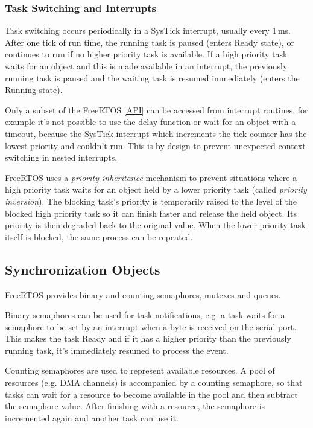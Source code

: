 \subsubsection{Task Switching and Interrupts}

Task switching occurs periodically in a SysTick interrupt, usually every 1\,ms. After one tick of run time, the running task is paused (enters Ready state), or continues to run if no higher priority task is available. If a high priority task waits for an object and this is made available in an interrupt, the previously running task is paused and the waiting task is resumed immediately (enters the Running state). 

Only a subset of the FreeRTOS \ref{API} can be accessed from interrupt routines, for example it's not possible to use the delay function or wait for an object with a timeout, because the SysTick interrupt which increments the tick counter has the lowest priority and couldn't run. This is by design to prevent unexpected context switching in nested interrupts.

FreeRTOS uses a \textit{priority inheritance} mechanism to prevent situations where a high priority task waits for an object held by a lower priority task (called \textit{priority inversion}). The blocking task's priority is temporarily raised to the level of the blocked high priority task so it can finish faster and release the held object. Its priority is then degraded back to the original value. When the lower priority task itself is blocked, the same process can be repeated.

\subsection{Synchronization Objects}

FreeRTOS provides binary and counting semaphores, mutexes and queues. 

Binary semaphores can be used for task notifications, e.g. a task waits for a semaphore to be set by an interrupt when a byte is received on the serial port. This makes the task Ready and if it has a higher priority than the previously running task, it's immediately resumed to process the event.

Counting semaphores are used to represent available resources. A pool of resources (e.g. \gls{DMA} channels) is accompanied by a counting semaphore, so that tasks can wait for a resource to become available in the pool and then subtract the semaphore value. After finishing with a resource, the semaphore is incremented again and another task can use it.

